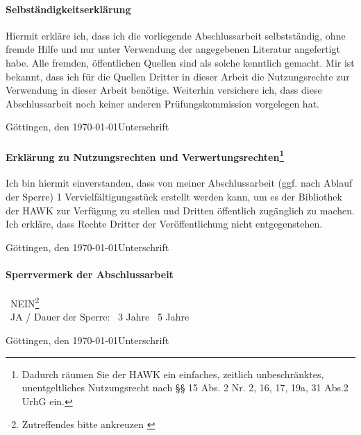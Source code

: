 

\paragraph*{Selbständigkeitserklärung}

Hiermit erkläre ich, dass ich die vorliegende Abschlussarbeit selbstständig, ohne fremde Hilfe und nur unter Verwendung der angegebenen Literatur angefertigt habe. Alle fremden, öffentlichen Quellen sind als solche kenntlich gemacht. Mir ist bekannt, dass ich für die Quellen Dritter in dieser Arbeit die Nutzungsrechte zur Verwendung in dieser Arbeit benötige. Weiterhin versichere ich, dass diese Abschlussarbeit noch keiner anderen Prüfungskommission vorgelegen hat.

\vspace{5mm}

Göttingen, den \today \hfill Unterschrift


\paragraph*{Erklärung zu Nutzungsrechten und Verwertungsrechten\footnote{Dadurch räumen Sie der HAWK ein einfaches, zeitlich unbeschränktes, unentgeltliches Nutzungsrecht nach §§ 15 Abs. 2 Nr. 2, 16, 17, 19a, 31 Abs.2 UrhG ein.}}

Ich bin hiermit einverstanden, dass von meiner Abschlussarbeit (ggf. nach Ablauf der Sperre) 1 Vervielfältigungsstück erstellt werden kann, um es der Bibliothek der HAWK zur Verfügung zu stellen und Dritten öffentlich zugänglich zu machen. Ich erkläre, dass Rechte Dritter der Veröffentlichung nicht entgegenstehen.\\

\vspace{5mm}

Göttingen, den \today \hfill Unterschrift

\paragraph*{Sperrvermerk der Abschlussarbeit}

\indent
\hspace{15mm}\Square~NEIN\footnote{Zutreffendes bitte ankreuzen \label{ftn:Zutreffendes}}  \\ 
\indent
\hspace{15mm}\Square~JA / Dauer der Sperre: \Square~3 Jahre \Square~5 Jahre

\vspace{5mm}

Göttingen, den \today \hfill Unterschrift

